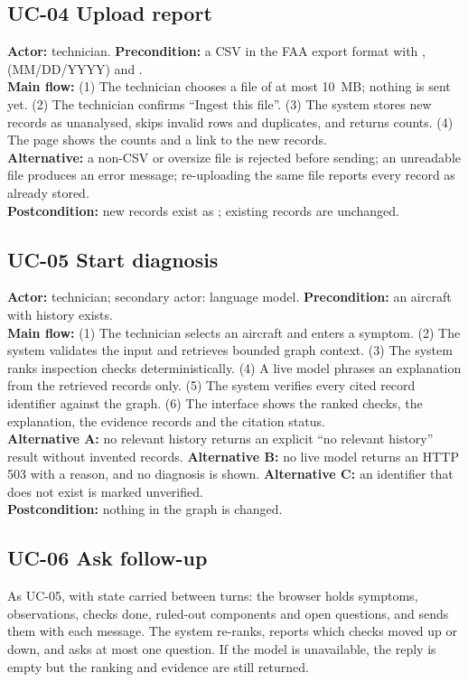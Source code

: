 \subsection*{UC-04 Upload report}
\textbf{Actor:} technician. \textbf{Precondition:} a CSV in the FAA export format with ,  (MM/DD/YYYY) and .\\
\textbf{Main flow:} (1) The technician chooses a  file of at most 10~MB; nothing is sent yet. (2) The technician confirms ``Ingest this file''. (3) The system stores new records as unanalysed, skips invalid rows and duplicates, and returns counts. (4) The page shows the counts and a link to the new records.\\
\textbf{Alternative:} a non-CSV or oversize file is rejected before sending; an unreadable file produces an error message; re-uploading the same file reports every record as already stored.\\
\textbf{Postcondition:} new records exist as ; existing records are unchanged.

\subsection*{UC-05 Start diagnosis}
\textbf{Actor:} technician; secondary actor: language model. \textbf{Precondition:} an aircraft with history exists.\\
\textbf{Main flow:} (1) The technician selects an aircraft and enters a symptom. (2) The system validates the input and retrieves bounded graph context. (3) The system ranks inspection checks deterministically. (4) A live model phrases an explanation from the retrieved records only. (5) The system verifies every cited record identifier against the graph. (6) The interface shows the ranked checks, the explanation, the evidence records and the citation status.\\
\textbf{Alternative A:} no relevant history returns an explicit ``no relevant history'' result without invented records. \textbf{Alternative B:} no live model returns an HTTP 503 with a reason, and no diagnosis is shown. \textbf{Alternative C:} an identifier that does not exist is marked unverified.\\
\textbf{Postcondition:} nothing in the graph is changed.

\subsection*{UC-06 Ask follow-up}
As UC-05, with state carried between turns: the browser holds symptoms, observations, checks done, ruled-out components and open questions, and sends them with each message. The system re-ranks, reports which checks moved up or down, and asks at most one question. If the model is unavailable, the reply is empty but the ranking and evidence are still returned.

